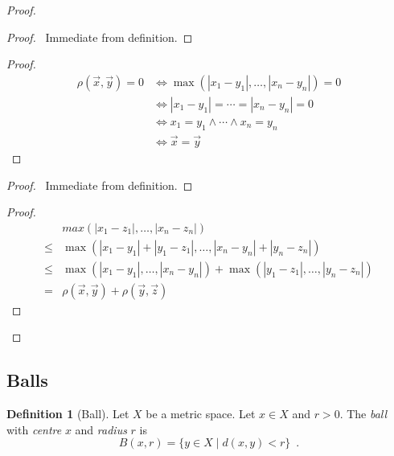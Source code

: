 \documentclass{book}
\let\qed\relax
\theoremstyle{definition}
\newtheorem{df}[ax]{Definition}
\begin{document}
\begin{proof}
\pf
{}
\begin{proof}
	\pf\ Immediate from definition.
\end{proof}
\begin{proof}
	\pf
	\begin{align*}
		\rho(\vec{x}, \vec{y}) = 0 & \Leftrightarrow \max(|x_1 - y_1|, \ldots, |x_n - y_n|) = 0 \\
		& \Leftrightarrow |x_1 - y_1| = \cdots = |x_n - y_n| = 0 \\
		& \Leftrightarrow x_1 = y_1 \wedge \cdots \wedge x_n = y_n \\
		& \Leftrightarrow \vec{x} = \vec{y}
	\end{align*}
\end{proof}
\begin{proof}
	\pf\ Immediate from definition.
\end{proof}
\begin{proof}
	\pf
	\begin{align*}
		& max(|x_1 - z_1|, \ldots, |x_n - z_n|) \\
		\leq & \max(|x_1 - y_1| + |y_1 - z_1|, \ldots, |x_n - y_n| + |y_n - z_n|) \\
		\leq & \max(|x_1 - y_1|, \ldots, |x_n - y_n|) + \max(|y_1 - z_1|, \ldots, |y_n - z_n|) \\
		= & \rho(\vec{x}, \vec{y}) + \rho(\vec{y}, \vec{z})
	\end{align*}
\end{proof}
\qed
\end{proof}

\subsection{Balls}

\begin{df}[Ball]
Let $X$ be a metric space. Let $x \in X$ and $r > 0$. The \emph{ball} with \emph{centre} $x$ and \emph{radius} $r$ is
\[ B(x,r) = \{ y \in X \mid d(x,y) < r \} \enspace . \]
\end{df}
\end{document}
